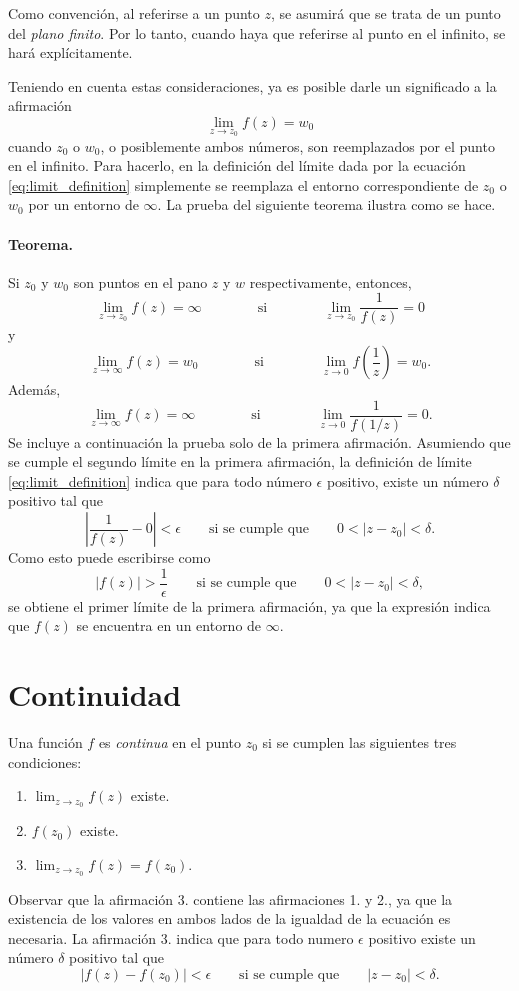 \documentclass[a4paper]{report}
\begin{document}
Como convención, al referirse a un punto \(z\), se asumirá que se trata de un punto del \emph{plano finito}. Por lo tanto, cuando haya que referirse al punto en el infinito, se hará explícitamente.

Teniendo en cuenta estas consideraciones, ya es posible darle un significado a la afirmación
\[
 \lim_{z\to z_0} f(z)=w_0
\]
cuando \(z_0\) o \(w_0\), o posiblemente ambos números, son reemplazados por el punto en el infinito. Para hacerlo, en la definición del límite dada por la ecuación \ref{eq:limit_definition} simplemente se reemplaza el entorno correspondiente de \(z_0\) o \(w_0\) por un entorno de \(\infty\). La prueba del siguiente teorema ilustra como se hace.

\paragraph{Teorema.} Si \(z_0\) y \(w_0\) son puntos en el pano \(z\) y \(w\) respectivamente, entonces,
\[
 \lim_{z\to z_0} f(z)=\infty
  \qquad\qquad\textrm{si}\qquad\qquad
 \lim_{z\to z_0} \frac{1}{f(z)}=0 
\]
y
\[
 \lim_{z\to \infty} f(z)=w_0
  \qquad\qquad\textrm{si}\qquad\qquad
 \lim_{z\to 0}f\left(\frac{1}{z}\right)=w_0. 
\]
Además,
\[
 \lim_{z\to \infty} f(z)=\infty
  \qquad\qquad\textrm{si}\qquad\qquad
 \lim_{z\to 0}\frac{1}{f(1/z)}=0. 
\]
Se incluye a continuación la prueba solo de la primera afirmación. Asumiendo que se cumple el segundo límite en la primera afirmación, la definición de límite \ref{eq:limit_definition} indica que para todo número \(\epsilon\) positivo, existe un número \(\delta\) positivo tal que 
\[
 \left|\frac{1}{f(z)}-0\right|<\epsilon
 \qquad\textrm{si se cumple que}\qquad
 0<|z-z_0|<\delta.
\]
Como esto puede escribirse como
\[
 |f(z)|>\frac{1}{\epsilon}
 \qquad\textrm{si se cumple que}\qquad
 0<|z-z_0|<\delta,
\]
se obtiene el primer límite de la primera afirmación, ya que la expresión indica que \(f(z)\) se encuentra en un entorno de \(\infty\).

\section{Continuidad}\label{sec:continuity_definition}

Una función \(f\) es \emph{continua} en el punto \(z_0\) si se cumplen las siguientes tres condiciones:
\begin{enumerate}
 \item \(\displaystyle\lim_{z\to z_0}f(z)\) existe.
 \item \(\displaystyle f(z_0)\) existe.
 \item \(\displaystyle\lim_{z\to z_0}f(z)=f(z_0)\).
\end{enumerate}
Observar que la afirmación 3. contiene las afirmaciones 1. y 2., ya que la existencia de los valores en ambos lados de la igualdad de la ecuación es necesaria. La afirmación 3. indica que para todo numero \(\epsilon\) positivo existe un número \(\delta\) positivo tal que
\begin{equation}\label{eq:continuity_definition}
 |f(z)-f(z_0)|<\epsilon
 \qquad\textrm{si se cumple que}\qquad
 |z-z_0|<\delta.
\end{equation}
\end{document}
